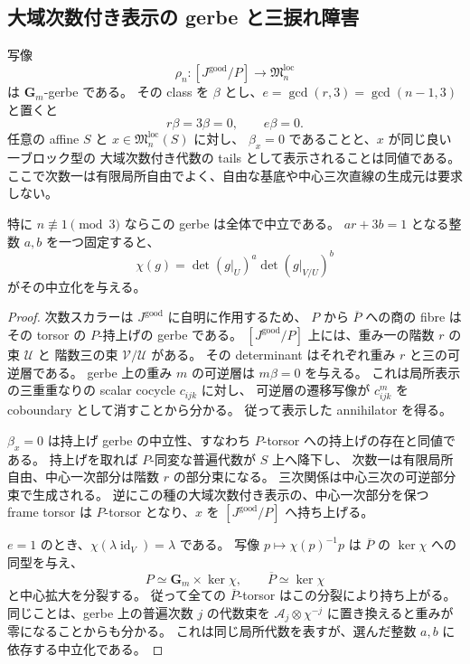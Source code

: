\subsection{大域次数付き表示の gerbe と三捩れ障害}

\begin{proposition}
\label{prop:nfm-presentation-gerbe}
写像
\[
 \rho_n:[J^{\mathrm{good}}/P]\longrightarrow
 \mathfrak M_n^{\mathrm{loc}}
\]
は $\mathbf G_m$-gerbe である。
その class を $\beta$ とし、$e=\gcd(r,3)=\gcd(n-1,3)$ と置くと
\[
 r\beta=3\beta=0,\qquad e\beta=0.
\]
任意の affine $S$ と $x\in\mathfrak M_n^{\mathrm{loc}}(S)$ に対し、
$\beta_x=0$ であることと、$x$ が同じ良い一ブロック型の
大域次数付き代数の tails として表示されることは同値である。
ここで次数一は有限局所自由でよく、自由な基底や中心三次直線の生成元は要求しない。

特に $n\not\equiv1\pmod3$ ならこの gerbe は全体で中立である。
$ar+3b=1$ となる整数 $a,b$ を一つ固定すると、
\[
 \chi(g)=\det(g|_U)^a\det(g|_{V/U})^b
\]
がその中立化を与える。
\end{proposition}

\begin{proof}
次数スカラーは $J^{\mathrm{good}}$ に自明に作用するため、
$P$ から $\overline P$ への商の fibre は
その torsor の $P$-持上げの gerbe である。
$[J^{\mathrm{good}}/P]$ 上には、重み一の階数 $r$ の束 $\mathcal U$ と
階数三の束 $\mathcal V/\mathcal U$ がある。
その determinant はそれぞれ重み $r$ と三の可逆層である。
gerbe 上の重み $m$ の可逆層は $m\beta=0$ を与える。
これは局所表示の三重重なりの scalar cocycle $c_{ijk}$ に対し、
可逆層の遷移写像が $c_{ijk}^{m}$ を coboundary として消すことから分かる。
従って表示した annihilator を得る。

$\beta_x=0$ は持上げ gerbe の中立性、すなわち $P$-torsor への持上げの存在と同値である。
持上げを取れば $P$-同変な普遍代数が $S$ 上へ降下し、
次数一は有限局所自由、中心一次部分は階数 $r$ の部分束になる。
三次関係は中心三次の可逆部分束で生成される。
逆にこの種の大域次数付き表示の、中心一次部分を保つ frame torsor は
$P$-torsor となり、$x$ を $[J^{\mathrm{good}}/P]$ へ持ち上げる。

$e=1$ のとき、$\chi(\lambda\operatorname{id}_V)=\lambda$ である。
写像 $p\mapsto\chi(p)^{-1}p$ は $\overline P$ の $\ker\chi$ への同型を与え、
\[
 P\simeq\mathbf G_m\times\ker\chi,\qquad
 \overline P\simeq\ker\chi
\]
と中心拡大を分裂する。
従って全ての $\overline P$-torsor はこの分裂により持ち上がる。
同じことは、gerbe 上の普遍次数 $j$ の代数束を
$\mathcal A_j\otimes\chi^{-j}$ に置き換えると重みが零になることからも分かる。
これは同じ局所代数を表すが、選んだ整数 $a,b$ に依存する中立化である。
\end{proof}

